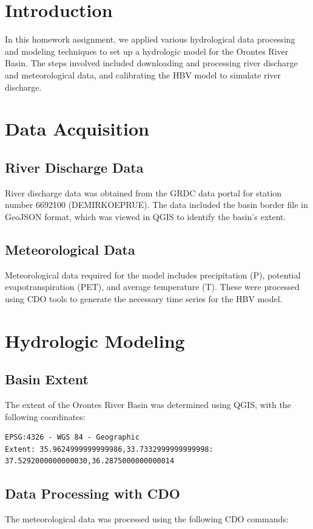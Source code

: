 \documentclass[a4paper, 12pt]{article}
\begin{document}
\tableofcontents
\newpage

\section{Introduction}
In this homework assignment, we applied various hydrological data processing and modeling techniques to set up a hydrologic model for the Orontes River Basin. The steps involved included downloading and processing river discharge and meteorological data, and calibrating the HBV model to simulate river discharge.

\section{Data Acquisition}
\subsection{River Discharge Data}
River discharge data was obtained from the GRDC data portal for station number 6692100 (DEMIRKOEPRUE). The data included the basin border file in GeoJSON format, which was viewed in QGIS to identify the basin's extent.

\subsection{Meteorological Data}
Meteorological data required for the model includes precipitation (P), potential evapotranspiration (PET), and average temperature (T). These were processed using CDO tools to generate the necessary time series for the HBV model.

\section{Hydrologic Modeling}
\subsection{Basin Extent}
The extent of the Orontes River Basin was determined using QGIS, with the following coordinates:
\begin{verbatim}
EPSG:4326 - WGS 84 - Geographic
Extent: 35.9624999999999986,33.7332999999999998: 37.5292000000000030,36.2875000000000014
\end{verbatim}

\subsection{Data Processing with CDO}
The meteorological data was processed using the following CDO commands:
\end{document}
